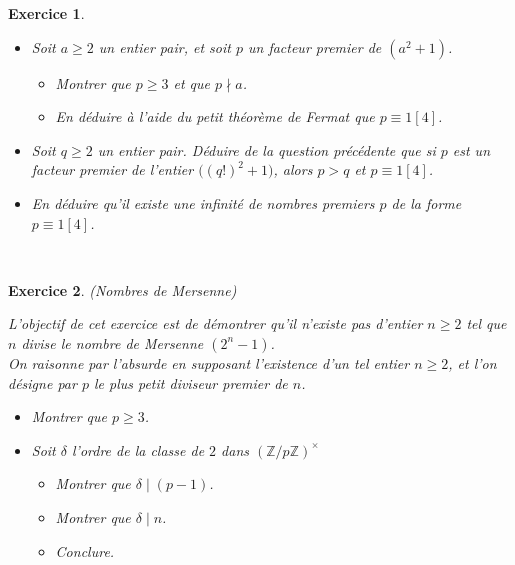 \documentclass[11pt,a4paper]{article}
\newtheorem{ex}{Exercice}
\begin{document}
\begin{ex} \
\begin{itemize}
\item[$1.$] Soit $ a \geqslant 2 $ un entier pair, et soit $p$ un facteur premier de $(a^2+1)$.
\begin{itemize}
\item[$a)$] Montrer que $p \geqslant 3$ et que $p \nmid a$.
\item[$b)$] En déduire à l'aide du petit théorème de Fermat que ${p}\equiv {1}[{4}] $.
\end{itemize} 
\item[$2.$] Soit $q \geqslant 2$ un entier pair. Déduire de la question précédente que si $p$ est un facteur premier de l'entier $\big( (q!)^2+1  \big) $, alors $p>q$ et $p \equiv 1 [4]$.
\item[$3.$] En déduire qu'il existe une infinité de nombres premiers $p$ de la forme $p \equiv 1 [4]$.
\end{itemize}
\end{ex}



\




\begin{ex}\label{nombre_mersenne}(Nombres de Mersenne) \

L'objectif de cet exercice est de démontrer qu'il n'existe pas d'entier $n \geqslant 2$ tel que $n$ divise le nombre de Mersenne $(2^n-1) $.\\
On raisonne par l'absurde en supposant l'existence d'un tel entier $n \geqslant 2$, et l'on désigne par $p$ le plus petit diviseur premier de $n$. 
\begin{itemize}
\item[$1.$] Montrer que $p \geqslant 3  $.
\item[$2.$] Soit $\delta$ l'ordre de la classe de $2$ dans $( \mathbb{Z}/p \mathbb{Z} )^{\times} $
\begin{itemize}
\item[$a)$] Montrer que $\delta \mid (p-1)$.
\item[$b)$] Montrer que $ \delta \mid n$.
\item[$c)$] Conclure.
\end{itemize}
\end{itemize}


\end{ex}
\end{document}
